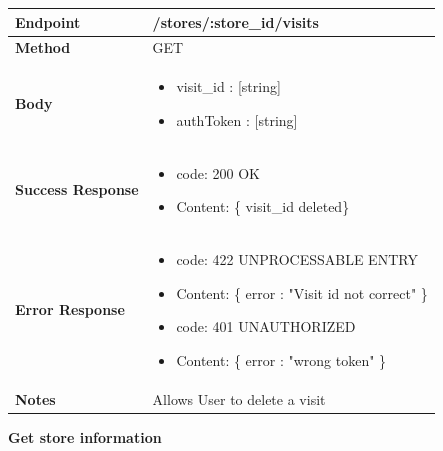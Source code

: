 \documentclass[a4paper, 12pt, oneside, table]{article}
\begin{document}
\begin{tabularx}{\linewidth}{| l | X |}
    
    \hline
     \textbf{Endpoint} & /stores/:store\_id/visits \\
    

    \hline
    \textbf{Method}  & GET   \\
    
    \hline
    \textbf{Body}  & \parbox{0.7\textwidth}{ \begin{itemize}[label={}] 
                \item visit\_id : [string]
                 \item authToken : [string]
               \end{itemize}}\\
    
    \hline
    \textbf{Success Response} & \parbox{0.7\textwidth}{ \begin{itemize}[label={}] 
                \item code: 200 OK
                 \item Content: \{ visit\_id deleted\}
               \end{itemize}}\\
    
    \hline
    
    \hline
        \textbf{Error Response} & \parbox{0.7\textwidth}{ \begin{itemize}[label={}] 
                \item code: 422 UNPROCESSABLE ENTRY
                 \item Content: \{ error : "Visit id not correct" \}
                  \item code: 401 UNAUTHORIZED
                 \item Content: \{ error : "wrong token" \}
               \end{itemize}}\\
    
    \hline
    \textbf{Notes} & Allows User to delete a visit \\

    \hline
    
\end{tabularx}


\textbf{Get store information}
\vspace{-2em}
\begin{tabularx}{0.8\textwidth} { 
  | >{\raggedright\arraybackslash}X 
  | >{\centering\arraybackslash}X 
  | >{\raggedleft\arraybackslash}X | }
 \hline

 \hline
 
\hline
\hline
 
\hline
\end{tabularx}
\end{document}
